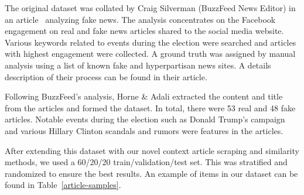 \documentclass{article}
\begin{document}
The original dataset was collated by Craig Silverman (BuzzFeed News Editor) in an article~\cite{dataset-buzzfeed} analyzing fake news. The analysis concentrates on the Facebook engagement on real and fake news articles shared to the social media website. Various keywords related to events during the election were searched and articles with highest engagement were collected. A ground truth was assigned by manual analysis using a list of known fake and hyperpartisan news sites. A details description of their process can be found in their article.

Following BuzzFeed's analysis, Horne \& Adali extracted the content and title from the articles and formed the dataset. In total, there were 53 real and 48 fake articles. Notable events during the election such as Donald Trump's campaign and various Hillary Clinton scandals and rumors were features in the articles.

After extending this dataset with our novel context article scraping and similarity methods, we used a 60/20/20 train/validation/test set. This was stratified and randomized to ensure the best results. An example of items in our dataset can be found in Table~\ref{article-samples}.

\begin{table}
  \begin{center}
  \end{center}
  \caption{A sample of one fake and real article in our dataset. The article ID, title and content are shown in the rows. Both articles are regarding a scandal with Hillary Clinton using a private server to store emails. The fake article reports on an event that never happens whereas the real article reports the true event -- that Clinton was exonerated from criminality.}
  \label{article-samples}
\end{table}
\end{document}
